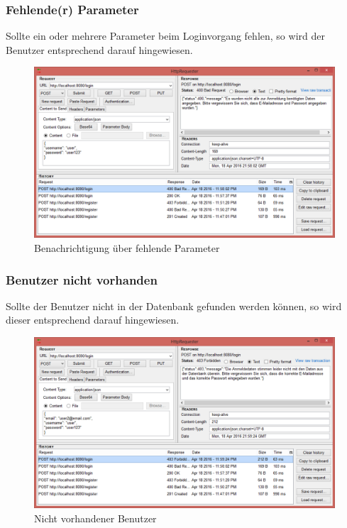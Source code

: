 \subsubsection{Fehlende(r) Parameter}

Sollte ein oder mehrere Parameter beim Loginvorgang fehlen, so wird der Benutzer entsprechend darauf hingewiesen.

\begin{figure}[H]
	\includegraphics[width=1\textwidth]{images/login_param_missing.png}
	\caption{Benachrichtigung über fehlende Parameter}
\end{figure}
\clearpage

\subsubsection{Benutzer nicht vorhanden}

Sollte der Benutzer nicht in der Datenbank gefunden werden können, so wird dieser entsprechend darauf hingewiesen.

\begin{figure}[H]
	\includegraphics[width=1\textwidth]{images/login_not_registered.png}
	\caption{Nicht vorhandener Benutzer}
\end{figure}

